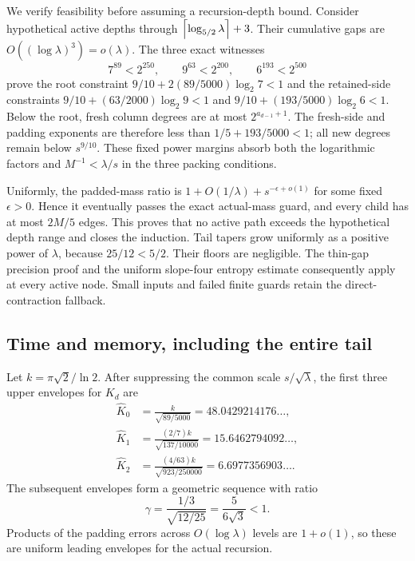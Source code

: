 We verify feasibility before assuming a recursion-depth bound. Consider
hypothetical active depths through
$\left\lceil\log_{5/2}\lambda\right\rceil+3$. Their cumulative gaps are
$O((\log\lambda)^3)=o(\lambda)$. The three exact witnesses
\[
 7^{89}<2^{250},\qquad 9^{63}<2^{200},\qquad 6^{193}<2^{500}
\]
prove the root constraint
$9/10+2(89/5000)\log_2 7<1$ and the retained-side constraints
$9/10+(63/2000)\log_2 9<1$ and
$9/10+(193/5000)\log_2 6<1$.
Below the root, fresh column degrees are at most $2^{a_{d-1}+1}$.
The fresh-side and padding exponents are therefore less than
$1/5+193/5000<1$; all new degrees remain below $s^{9/10}$.
These fixed power margins absorb both the logarithmic factors and
$M^{-1}<\lambda/s$ in the three packing conditions.

Uniformly, the padded-mass ratio is
$1+O(1/\lambda)+s^{-\epsilon+o(1)}$ for some fixed $\epsilon>0$.
Hence it eventually passes the exact actual-mass guard, and every child
has at most $2M/5$ edges. This proves that no active path exceeds the
hypothetical depth range and closes the induction. Tail tapers grow
uniformly as a positive power of $\lambda$, because $25/12<5/2$.
Their floors are negligible. The thin-gap precision proof and the uniform
slope-four entropy estimate consequently apply at every active node.
Small inputs and failed finite guards retain the direct-contraction fallback.

\subsection{Time and memory, including the entire tail}

Let $k=\pi\sqrt2/\ln2$. After suppressing the common scale
$s/\sqrt\lambda$, the first three upper envelopes for $K_d$ are
\begin{align*}
 \widehat K_0&=\frac{k}{\sqrt{89/5000}}
       =48.0429214176\ldots,\\
 \widehat K_1&=\frac{(2/7)k}{\sqrt{137/10000}}
       =15.6462794092\ldots,\\
 \widehat K_2&=\frac{(4/63)k}{\sqrt{923/250000}}
       =6.6977356903\ldots.
\end{align*}
The subsequent envelopes form a geometric sequence with ratio
\[
 \gamma=\frac{1/3}{\sqrt{12/25}}=\frac5{6\sqrt3}<1.
\]
Products of the padding errors across $O(\log\lambda)$ levels are
$1+o(1)$, so these are uniform leading envelopes for the actual recursion.

